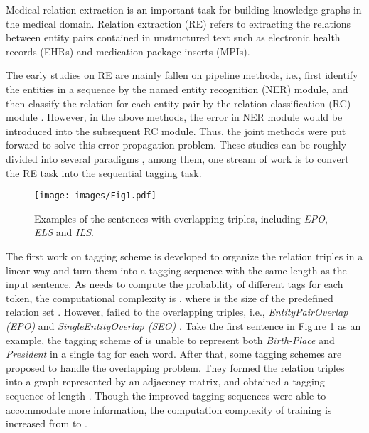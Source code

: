 \documentclass[conference]{IEEEtran}
\newcommand{\yankun}[1]{\textcolor{black}{#1}}
\begin{document}
Medical relation extraction is an important task for building knowledge graphs in the medical domain. Relation extraction (RE) refers to extracting the relations between entity pairs contained in unstructured text such as electronic health records (EHRs) and medication package inserts (MPIs).



The early studies on RE are mainly fallen on pipeline methods, i.e., first identify the entities in a sequence by the named entity recognition (NER) module, and then classify the relation for each entity pair by the relation classification (RC) module \cite{Socher2012Semantic,Zeng2014Relation}. However, in the above methods, the error in NER module would be introduced into the subsequent RC module. Thus, the joint methods were put forward to solve this error propagation problem. These studies
can be roughly divided into several paradigms \cite{Miwa2016End,Zheng2017Joint,Zeng2018Extracting}, among them, one stream of work is to convert the RE task into the sequential tagging task.
\begin{figure}[t]
    \centering
    \texttt{[image: images/Fig1.pdf]}
\caption{Examples of the sentences with overlapping triples, including \emph{EPO}, \emph{ELS} and \emph{ILS}.}
    \label{Fig:overlapping}
\end{figure}
The first work on tagging scheme \cite{Zheng2017Joint} is developed to organize the relation triples in a linear way and turn them into a tagging sequence with the same length  as the input sentence. \yankun{As }\cite{Zheng2017Joint} needs to compute the probability of different tags for each token, 
the computational complexity is , where  is the size of the predefined relation set . However, 
\yankun{\cite{Zheng2017Joint}} failed to the overlapping triples, i.e., \emph{EntityPairOverlap (EPO)} and \emph{SingleEntityOverlap (SEO)} \cite{Zeng2018Extracting}. Take the first sentence in Figure \ref{Fig:overlapping} as an example, the tagging scheme of \cite{Zheng2017Joint} is unable to represent both \emph{Birth-Place} and \emph{President} in a single tag for each word. After that, some tagging schemes \cite{Dai2019Joint,Wang2020TPLinker} are proposed to handle the overlapping problem. They formed the relation triples into a graph represented by an adjacency matrix, and obtained a tagging sequence of length . Though the improved tagging sequences were able to accommodate more information, the computation complexity of training 
\yankun{is increased from  }to .
\end{document}
